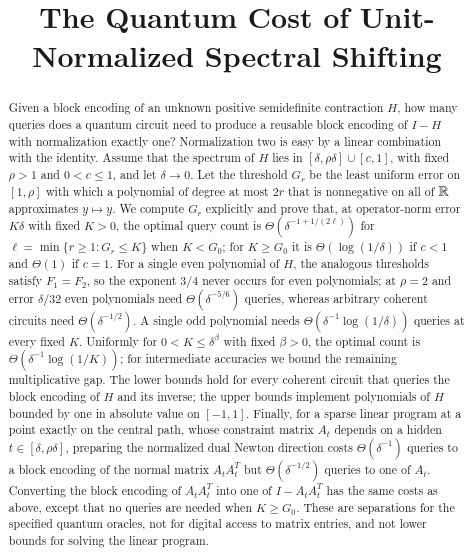 \documentclass[11pt]{article}
\title{The Quantum Cost of Unit-Normalized Spectral Shifting}
\author{}
\date{}
\begin{document}
\maketitle
\begin{abstract}
Given a block encoding of an unknown positive semidefinite contraction $H$, how many queries does a quantum circuit need to produce a reusable block encoding of $I-H$ with normalization exactly one? Normalization two is easy by a linear combination with the identity. Assume that the spectrum of $H$ lies in $[\delta,\rho\delta]\cup[c,1]$, with fixed $\rho>1$ and $0<c\leq1$, and let $\delta\to0$. Let the threshold $G_r$ be the least uniform error on $[1,\rho]$ with which a polynomial of degree at most $2r$ that is nonnegative on all of $\mathbb R$ approximates $y\mapsto y$. We compute $G_r$ explicitly and prove that, at operator-norm error $K\delta$ with fixed $K>0$, the optimal query count is $\Theta(\delta^{-1+1/(2\ell)})$ for $\ell=\min\{r\geq1:G_r\leq K\}$ when $K<G_0$; for $K\geq G_0$ it is $\Theta(\log(1/\delta))$ if $c<1$ and $\Theta(1)$ if $c=1$. For a single even polynomial of $H$, the analogous thresholds satisfy $F_1=F_2$, so the exponent $3/4$ never occurs for even polynomials; at $\rho=2$ and error $\delta/32$ even polynomials need $\Theta(\delta^{-5/6})$ queries, whereas arbitrary coherent circuits need $\Theta(\delta^{-1/2})$. A single odd polynomial needs $\Theta(\delta^{-1}\log(1/\delta))$ queries at every fixed $K$. Uniformly for $0<K\leq\delta^\beta$ with fixed $\beta>0$, the optimal count is $\Theta(\delta^{-1}\log(1/K))$; for intermediate accuracies we bound the remaining multiplicative gap. The lower bounds hold for every coherent circuit that queries the block encoding of $H$ and its inverse; the upper bounds implement polynomials of $H$ bounded by one in absolute value on $[-1,1]$. Finally, for a sparse linear program at a point exactly on the central path, whose constraint matrix $A_t$ depends on a hidden $t\in[\delta,\rho\delta]$, preparing the normalized dual Newton direction costs $\Theta(\delta^{-1})$ queries to a block encoding of the normal matrix $A_tA_t^T$ but $\Theta(\delta^{-1/2})$ queries to one of $A_t$. Converting the block encoding of $A_tA_t^T$ into one of $I-A_tA_t^T$ has the same costs as above, except that no queries are needed when $K\geq G_0$. These are separations for the specified quantum oracles, not for digital access to matrix entries, and not lower bounds for solving the linear program.
\end{abstract}










\end{document}
